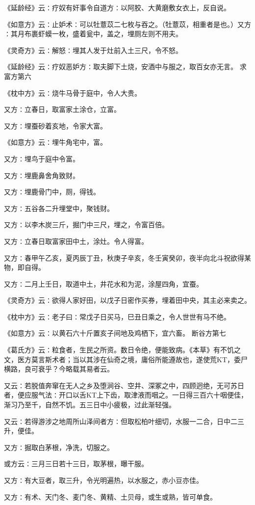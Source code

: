 \documentclass[a4paper,12pt,UTF8,twoside]{ctexbook}
\begin{document}
《延龄经》云∶疗奴有奸事令自道方∶以阿胶、大黄磨敷女衣上，反自说。

《如意方》云∶止妒术∶可以牡薏苡二七枚与吞之。（牡薏苡，相重者是也。）又方∶其月布裹虾蟆一枚，盛着瓮中，盖之，埋厕左则不用夫。

《灵奇方》云∶解怒∶埋其人发于灶前入土三尺，令不怒。

《延龄经》云∶疗奴恶妒方∶取夫脚下土烧，安酒中与服之，取百女亦无言。
求富方第六

《枕中方》云∶烧牛马骨于庭中，令人大贵。

又方∶立春日，取富家土涂仓，立富。

又方∶埋蚕砂着亥地，令家大富。

《如意方》云∶埋牛角宅中，富。

又方∶埋鸟于庭中令富。

又方∶埋鹿鼻舍角致财。

又方∶埋鹿骨门中，厕，得钱。

又方∶五谷各二升埋堂中，聚钱财。

又方∶以李木炭三斤，掘门中三尺，埋之，令富百倍。

又方∶立春日取富家田中土，涂灶。令人得富。

又方∶春甲午乙亥，夏丙辰丁丑，秋庚子辛亥，冬壬寅癸卯，夜半向北斗祝欲得某物，即自得。

又方∶二月上壬日，取道中土，井花水和为泥，涂屋四角，宜蚕。

《灵奇方》云∶欲得人家好田，以戊子日密作买券，埋着田中央，其主必来卖之。

《枕中方》云∶老子曰∶常戊子日买马，巳丑日乘之，令人世世有马不绝。

《如意方》云∶以黄石六十斤置亥子间地及鸡栖下，宜六畜。
断谷方第七

《葛氏方》云∶粒食者，生民之所资。数日令绝，便能致病。《本草》有不饥之文，医方莫言斯术者；当以其涉在仙奇之境，庸俗所能遵故也，遂使荒KT，委尸横路，良可衰乎？今略载其易者云。

又云∶若脱值奔窜在无人之乡及堕涧谷、空井、深冢之中，四顾迥绝，无可苏日者，便应服气法∶开口以舌KT上下齿，取津液而咽之。一日得三百六十咽便佳，渐习乃至千，自然不饥。五三日中小疲极，过此渐轻强。

又云∶若得游涉之地周所山泽间者方∶但取松柏叶细切，水服一二合，日中二三升，便佳。

又方∶掘取白茅根，净洗，切服之。

或方云∶三月三日若十三日，取茅根，曝干服。

又方∶有大豆者，取三升，令光明遍热，以水服之，赤小豆亦佳。

又方∶有术、天门冬、麦门冬、黄精、土贝母，或生或熟，皆可单食。
\end{document}
